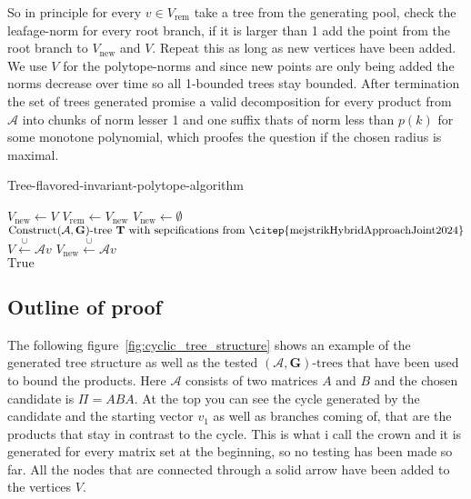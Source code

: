 \newline
So in principle for every $v \in V_{\text{rem}}$ take a tree from the generating pool, check the leafage-norm for every root branch, if it is larger than 1 add the point from the root branch to $V_{\text{new}}$ and $V$. Repeat this as long as new vertices have been added. We use $V$ for the polytope-norms and since new points are only being added the norms decrease over time so all 1-bounded trees stay bounded.
\newline
After termination the set of trees generated promise a valid decomposition for every product from $\mathcal{A}$ into chunks of norm lesser 1 and one suffix thats of norm less than $p(k)$ for some monotone polynomial, which proofes the question if the chosen radius is maximal.

\vspace{1cm}

\begin{algorithm}
  \caption{Tree-flavored-invariant-polytope-algorithm}
  \label{alg:hybrid}
  \begin{algorithmic}
      \State {}
      \State {}
      \State $V_{\text{new}} \gets V$
          \State $V_{\text{rem}} \gets V_{\text{new}}$
          \State $V_{\text{new}} \gets \emptyset$
              \State $\text{Construct} (\mathcal{A},\mathbf{G})\text{-tree } \mathbf{T} \text{ with sepcifications from \citep{mejstrikHybridApproachJoint2024}}$
                  \State $V \xleftarrow{\cup}\mathcal{A} v$
                  \State $V_{\text{new}} \xleftarrow{\cup} \mathcal{A}v$
              \EndIf  
          \EndFor
      \EndWhile \\
      \Return $\text{True}$
  \end{algorithmic}
\end{algorithm}

\vspace{1cm}

\subsection{Outline of proof}
The following figure~\ref{fig:cyclic_tree_structure} shows an example of the generated tree structure as well as the tested $(\mathcal{A},\mathbf{G})\text{-trees}$ that have been used to bound the products. Here $\mathcal{A}$ consists of two matrices $A$ and $B$ and the chosen candidate is $ \Pi = ABA$. At the top you can see the cycle generated by the candidate and the starting vector $v_1$ as well as branches coming of, that are the products that stay in contrast to the cycle. This is what i call the crown and it is generated for every matrix set at the beginning, so no testing has been made so far. All the nodes that are connected through a solid arrow have been added to the vertices $V$.


